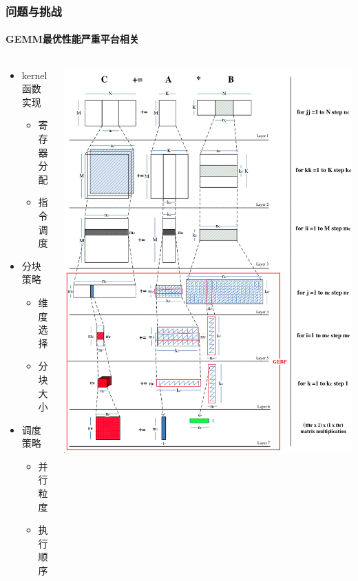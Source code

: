 \documentclass[aspectratio=169]{beamer}
\begin{document}
\begin{frame}
  \frametitle{问题与挑战}
  \framesubtitle{GEMM最优性能严重平台相关}
  \begin{columns}
    \begin{column}{.5\textwidth}
      \begin{itemize}
      \item kernel函数实现
        \begin{itemize}
        \item 寄存器分配
        \item 指令调度
        \end{itemize}
      \item 分块策略
        \begin{itemize}
        \item 维度选择
        \item 分块大小
        \end{itemize}
      \item 调度策略
        \begin{itemize}
        \item 并行粒度
        \item 执行顺序
        \end{itemize}
      \end{itemize}
    \end{column}
    \begin{column}{.5\textwidth}
      \includegraphics[width=.8\textwidth]{gemm}
    \end{column}
  \end{columns}
\end{frame}
\end{document}

